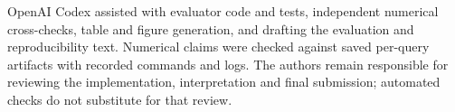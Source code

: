 OpenAI Codex assisted with evaluator code and tests, independent numerical
cross-checks, table and figure generation, and drafting the evaluation and
reproducibility text. Numerical claims were checked against saved per-query
artifacts with recorded commands and logs. The authors remain responsible
for reviewing the implementation, interpretation and final submission;
automated checks do not substitute for that review.
